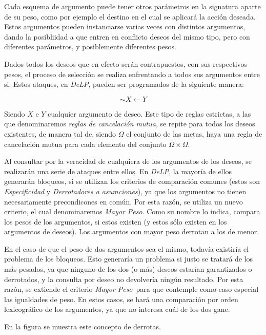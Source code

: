 \documentclass[oneside]{book}
\begin{document}
Cada esquema de argumento puede tener otros parámetros en la signatura aparte de su peso,
como por ejemplo el destino en el cual se aplicará la acción deseada. Estos argumentos
pueden instanciarse varias veces con distintos argumentos, dando la posibliidad a que 
entren en conflicto deseos del mismo tipo, pero con diferentes parámetros, y posiblemente
diferentes pesos.

Dados todos los deseos que en efecto serán contrapuestos, con sus respectivos pesos, el 
proceso de selección se realiza enfrentando a todos sus argumentos entre si. Estos 
ataques, en \textit{DeLP}, pueden ser programados de la siguiente manera:

$$ \sim X \leftarrow Y$$ 

Siendo $X$ e $Y$ cualquier argumento de deseo. Este tipo de reglas estrictas, a las que
denominaremos \textit{reglas de cancelación mutua}, se repite 
para todos los deseos existentes, de manera tal de, siendo $\Omega$ el conjunto de las 
metas, haya una regla de cancelación mutua para cada elemento del conjunto
$\Omega \times \Omega$.

Al consultar por la veracidad de cualquiera de los argumentos de los deseos, se 
realizarán una serie de ataques entre ellos. En \textit{DeLP}, la mayoría de ellos
generarán bloqueos, si se 
utilizan los criterios de comparación comunes (estos son \textit{Especificidad} y 
\textit{Derrotadores a asumciones}), ya que los argumentos no tienen necesariamente 
precondicones en común. Por esta razón, se utiliza un nuevo criterio, el cual 
denominaremos \textit{Mayor Peso}. Como su nombre lo indica, compara los pesos de los 
argumentos, si estos existen (y estos sólo existen en los argumentos de deseos). Los 
argumentos con mayor peso derrotan a los de menor.

En el caso de que el peso de dos argumentos sea el mismo, todavía existiría el problema 
de los bloqueos. Esto generaría un problema si justo se tratará de los más pesados, ya 
que ninguno de los dos (o más) deseos estarían garantizados o derrotados, y la consulta
por deseo no devolvería ningún resultado. Por esta razón, se extiende el criterio 
\textit{Mayor Peso}\ para que contemple como caso especial las igualdades de peso. En 
estos casos, se hará una comparación por orden lexicográfico de los argumentos, ya que
no interesa cuál de los dos gane. 

En la figura %
se muestra este concepto de derrotas. %

\end{document}
